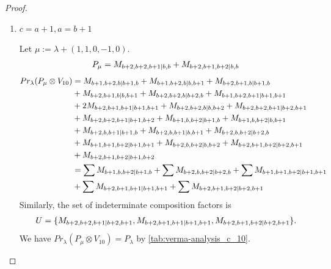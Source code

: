 \begin{proof}
\begin{enumerate}
\begin{enumerate}
        \item $c=a+1,a=b+1$ \par
        Let $\mu:=\lambda + (1,1,0,-1,0) $.
        \begin{equation}\notag
          \begin{aligned}
            P_\mu = M_{b+2,b+2,b+1|b,b}
+ M_{b+2,b+1,b+2|b,b}
          \end{aligned}
        \end{equation}
        \begin{equation}\notag
          \begin{aligned}
            Pr_{\lambda}(P_\mu \otimes V_{10}) &=
M_{b+1,b+2,b|b+1,b}
+ M_{b+1,b+2,b|b,b+1}
+ M_{b+2,b+1,b|b+1,b}\\
                                              &
+ M_{b+2,b+1,b|b,b+1}
+ M_{b+2,b+2,b|b+2,b}
+ M_{b+1,b+2,b+1|b+1,b+1}\\
                                              &
+ 2M_{b+2,b+1,b+1|b+1,b+1}
+ M_{b+2,b+2,b|b,b+2}
+ M_{b+2,b+2,b+1|b+2,b+1}\\
                                              &
+ M_{b+2,b+2,b+1|b+1,b+2}
+ M_{b+1,b,b+2|b+1,b}
+ M_{b+1,b,b+2|b,b+1}\\
                                              &
+ M_{b+2,b,b+1|b+1,b}
+ M_{b+2,b,b+1|b,b+1}
+ M_{b+2,b,b+2|b+2,b}\\
                                              &
+ M_{b+1,b+1,b+2|b+1,b+1}
+ M_{b+2,b,b+2|b,b+2}
+ M_{b+2,b+1,b+2|b+2,b+1}\\
                                              &
+ M_{b+2,b+1,b+2|b+1,b+2} \\
                                               &=
\sum M_{b+1,b,b+2|b+1,b}
+ \sum M_{b+2,b,b+2|b+2,b}
+ \sum M_{b+1,b+1,b+2|b+1,b+1}\\
                                              &
+ \sum M_{b+2,b+1,b+1|b+1,b+1}
+ \sum M_{b+2,b+1,b+2|b+2,b+1}
          \end{aligned}
        \end{equation}
      Similarly, the set of indeterminate composition factors is 
\begin{equation}\notag
  \begin{aligned}
    U = \{
M_{b+2,b+2,b+1|b+2,b+1},
M_{b+2,b+1,b+1|b+1,b+1},
M_{b+2,b+1,b+2|b+2,b+1}
\}.
  \end{aligned}
\end{equation}
       We have $Pr_{\lambda}(P_\mu \otimes V_{10}) = P_\lambda  $ by \cref{tab:verma-analysis_c_10}.
\begin{table}[htbp]

\end{table}
\end{enumerate}
\end{enumerate}
\end{proof}
